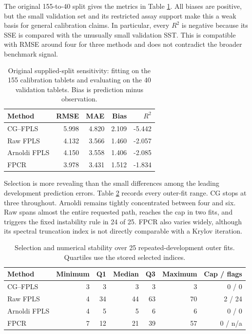 The original 155-to-40 split gives the metrics in Table
\ref{tab:app-spectroscopy-original-split}.  All biases are positive, but the
small validation set and its restricted assay support make this a weak basis
for general calibration claims.  In particular, every $R^2$ is negative
because its SSE is compared with the unusually small validation SST.  This is
compatible with RMSE around four for three methods and does not contradict the
broader benchmark signal.

\begin{table}[htbp]
    \centering
    \small
    \caption[Original calibration--validation split sensitivity]{Original supplied-split sensitivity: fitting on the 155
    calibration tablets and evaluating on the 40 validation tablets.  Bias is
    prediction minus observation.}
    \label{tab:app-spectroscopy-original-split}
    \begin{tabular}{@{}lrrrr@{}}
        \toprule
        Method & RMSE & MAE & Bias & $R^2$ \\
        \midrule
        CG--FPLS     & 5.998 & 4.820 & 2.109 & -5.442 \\
        Raw FPLS     & 4.132 & 3.566 & 1.460 & -2.057 \\
        Arnoldi FPLS & 4.150 & 3.558 & 1.406 & -2.085 \\
        FPCR         & 3.978 & 3.431 & 1.512 & -1.834 \\
        \bottomrule
    \end{tabular}
\end{table}

Selection is more revealing than the small differences among the leading
development prediction errors.  Table
\ref{tab:app-spectroscopy-selection-stability} records every outer-fit range.
CG stops at three throughout.  Arnoldi remains tightly concentrated between
four and six.  Raw spans almost the entire requested path, reaches the cap in
two fits, and triggers the fixed instability rule in 24 of 25.  FPCR also
varies widely, although its spectral truncation index is not directly
comparable with a Krylov iteration.

\begin{table}[htbp]
    \centering
    \small
    \caption[Development selection and numerical stability]{Selection and numerical stability over 25 repeated-development
    outer fits.  Quartiles use the stored selected indices.}
    \label{tab:app-spectroscopy-selection-stability}
    \begin{tabular}{@{}lrrrrrr@{}}
        \toprule
        Method & Minimum & Q1 & Median & Q3 & Maximum & Cap / flags \\
        \midrule
        CG--FPLS     & 3 & 3  & 3  & 3  & 3  & 0 / 0 \\
        Raw FPLS     & 4 & 34 & 44 & 63 & 70 & 2 / 24 \\
        Arnoldi FPLS & 4 & 5  & 5  & 6  & 6  & 0 / 0 \\
        FPCR         & 7 & 12 & 21 & 39 & 57 & 0 / n/a \\
        \bottomrule
    \end{tabular}
\end{table}

